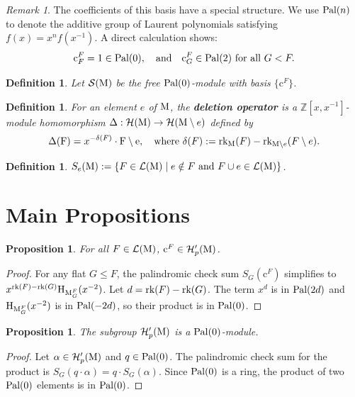 \documentclass[11pt]{article}
\newcommand{\calH}{\mathcal{H}}
\newcommand{\calS}{\mathcal{S}}
\newcommand{\augchow}{\normalfont\text{H}}
\newcommand{\rank}{\normalfont\text{rk}}
\newcommand{\M}{\normalfont\text{M}}
\newcommand{\ZZ}{\mathbb{Z}}
\newcommand{\Ebasis}[1]{\mathrm{#1}}
\newcommand{\Cbasis}[1]{\mathrm{c}^{#1}}
\newcommand{\CbasisSub}[2]{\mathrm{c}^{#1}_{#2}}
\newcommand{\pal}{\normalfont\text{Pal}}
\newtheorem{proposition}[theorem]{Proposition}
\newtheorem{definition}[theorem]{Definition}
\theoremstyle{remark}
\newtheorem*{remark}{Remark} %
\begin{document}
\begin{remark}
    The coefficients of this basis have a special structure. We use \(\pal(n)\) to denote the additive group of Laurent polynomials satisfying \(f(x) = x^n f(x^{-1})\). A direct calculation shows:
    \[\CbasisSub{F}{F} = 1 \in \pal(0),\quad\text{and}\quad\CbasisSub{F}{G}
        \in \pal(2)\ \text{for all}\ G < F.\]
\end{remark}

\begin{definition}
    Let \(\calS(\M)\) be the free \(\pal(0)\)-module with basis \(\{\Cbasis{F}\}\).
\end{definition}

\begin{definition}
    For an element \(e\) of \(\M\), the \textbf{deletion operator} is a \(\ZZ[x, x^{-1}]\)-module homomorphism \(\Delta : \calH(\M) \to \calH(\M \setminus e)\) defined by
    \[\Delta(\Ebasis{F}) = x^{-\delta(F)}\cdot \Ebasis{F \setminus e}, \quad \text{where } \delta(F) := \rank_{\M}(F) - \rank_{\M \setminus e}(F \setminus e).\]
\end{definition}

\begin{definition}
    \(S_e(\M) := \{ F \in \mathcal{L}(\M) \mid e \notin F \text{ and } F\cup e \in \mathcal{L}(\M) \}\).
\end{definition}

\section{Main Propositions}

\begin{proposition}\label{prop:cinHp}
    For all \(F \in \mathcal{L}(\M)\), \(\Cbasis{F} \in \calH'_p(\M)\).
\end{proposition}
\begin{proof}
    For any flat \(G \leq F\), the palindromic check sum \(S_G(\Cbasis{F})\) simplifies to \(x^{\rank(F)-\rank(G)} \augchow_{\M_G^F}(x^{-2})\). Let \(d = \rank(F)-\rank(G)\). The term \(x^d\) is in \(\pal(2d)\) and \(\augchow_{\M_G^F}(x^{-2})\) is in \(\pal(-2d)\), so their product is in \(\pal(0)\).
\end{proof}

\begin{proposition}\label{prop:Hp_is_pal0_mod}
    The subgroup \(\calH'_p(\M)\) is a \(\pal(0)\)-module.
\end{proposition}
\begin{proof}
    Let \(\alpha \in \calH'_p(\M)\) and \(q \in \pal(0)\). The palindromic check sum for the product is \(S_G(q \cdot \alpha) = q \cdot S_G(\alpha)\). Since \(\pal(0)\) is a ring, the product of two \(\pal(0)\) elements is in \(\pal(0)\).
\end{proof}
\end{document}

